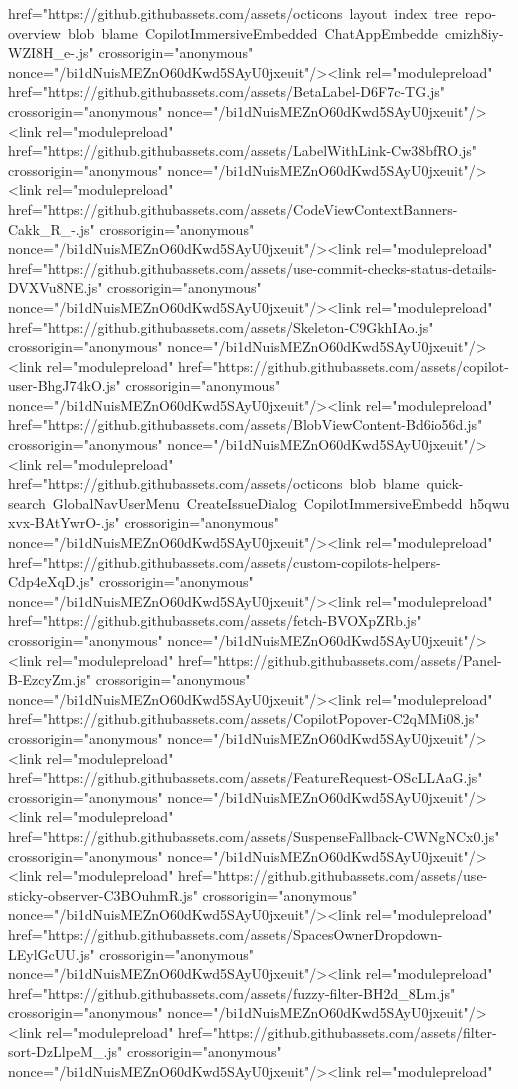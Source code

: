 href="https://github.githubassets.com/assets/octicons~layout~index~tree~repo-overview~blob~blame~CopilotImmersiveEmbedded~ChatAppEmbedde~cmizh8iy-WZI8H_e-.js" crossorigin="anonymous" nonce="/bi1dNuisMEZnO60dKwd5SAyU0jxeuit"/><link rel="modulepreload" href="https://github.githubassets.com/assets/BetaLabel-D6F7c-TG.js" crossorigin="anonymous" nonce="/bi1dNuisMEZnO60dKwd5SAyU0jxeuit"/><link rel="modulepreload" href="https://github.githubassets.com/assets/LabelWithLink-Cw38bfRO.js" crossorigin="anonymous" nonce="/bi1dNuisMEZnO60dKwd5SAyU0jxeuit"/><link rel="modulepreload" href="https://github.githubassets.com/assets/CodeViewContextBanners-Cakk_R_-.js" crossorigin="anonymous" nonce="/bi1dNuisMEZnO60dKwd5SAyU0jxeuit"/><link rel="modulepreload" href="https://github.githubassets.com/assets/use-commit-checks-status-details-DVXVu8NE.js" crossorigin="anonymous" nonce="/bi1dNuisMEZnO60dKwd5SAyU0jxeuit"/><link rel="modulepreload" href="https://github.githubassets.com/assets/Skeleton-C9GkhIAo.js" crossorigin="anonymous" nonce="/bi1dNuisMEZnO60dKwd5SAyU0jxeuit"/><link rel="modulepreload" href="https://github.githubassets.com/assets/copilot-user-BhgJ74kO.js" crossorigin="anonymous" nonce="/bi1dNuisMEZnO60dKwd5SAyU0jxeuit"/><link rel="modulepreload" href="https://github.githubassets.com/assets/BlobViewContent-Bd6io56d.js" crossorigin="anonymous" nonce="/bi1dNuisMEZnO60dKwd5SAyU0jxeuit"/><link rel="modulepreload" href="https://github.githubassets.com/assets/octicons~blob~blame~quick-search~GlobalNavUserMenu~CreateIssueDialog~CopilotImmersiveEmbedd~h5qwuxvx-BAtYwrO-.js" crossorigin="anonymous" nonce="/bi1dNuisMEZnO60dKwd5SAyU0jxeuit"/><link rel="modulepreload" href="https://github.githubassets.com/assets/custom-copilots-helpers-Cdp4eXqD.js" crossorigin="anonymous" nonce="/bi1dNuisMEZnO60dKwd5SAyU0jxeuit"/><link rel="modulepreload" href="https://github.githubassets.com/assets/fetch-BVOXpZRb.js" crossorigin="anonymous" nonce="/bi1dNuisMEZnO60dKwd5SAyU0jxeuit"/><link rel="modulepreload" href="https://github.githubassets.com/assets/Panel-B-EzcyZm.js" crossorigin="anonymous" nonce="/bi1dNuisMEZnO60dKwd5SAyU0jxeuit"/><link rel="modulepreload" href="https://github.githubassets.com/assets/CopilotPopover-C2qMMi08.js" crossorigin="anonymous" nonce="/bi1dNuisMEZnO60dKwd5SAyU0jxeuit"/><link rel="modulepreload" href="https://github.githubassets.com/assets/FeatureRequest-OScLLAaG.js" crossorigin="anonymous" nonce="/bi1dNuisMEZnO60dKwd5SAyU0jxeuit"/><link rel="modulepreload" href="https://github.githubassets.com/assets/SuspenseFallback-CWNgNCx0.js" crossorigin="anonymous" nonce="/bi1dNuisMEZnO60dKwd5SAyU0jxeuit"/><link rel="modulepreload" href="https://github.githubassets.com/assets/use-sticky-observer-C3BOuhmR.js" crossorigin="anonymous" nonce="/bi1dNuisMEZnO60dKwd5SAyU0jxeuit"/><link rel="modulepreload" href="https://github.githubassets.com/assets/SpacesOwnerDropdown-LEylGcUU.js" crossorigin="anonymous" nonce="/bi1dNuisMEZnO60dKwd5SAyU0jxeuit"/><link rel="modulepreload" href="https://github.githubassets.com/assets/fuzzy-filter-BH2d_8Lm.js" crossorigin="anonymous" nonce="/bi1dNuisMEZnO60dKwd5SAyU0jxeuit"/><link rel="modulepreload" href="https://github.githubassets.com/assets/filter-sort-DzLlpeM_.js" crossorigin="anonymous" nonce="/bi1dNuisMEZnO60dKwd5SAyU0jxeuit"/><link rel="modulepreload" 